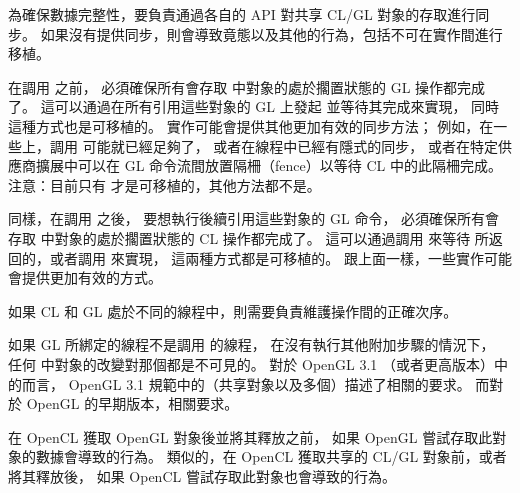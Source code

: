 為確保數據完整性，要負責通過各自的 API 對共享 CL/GL 對象的存取進行同步。
如果沒有提供同步，則會導致竟態以及其他的行為，包括不可在實作間進行移植。

在調用  之前，
必須確保所有會存取  中對象的處於擱置狀態的 GL 操作都完成了。
這可以通過在所有引用這些對象的 GL 上發起  並等待其完成來實現，
同時這種方式也是可移植的。
實作可能會提供其他更加有效的同步方法；
例如，在一些上，調用  可能就已經足夠了，
或者在線程中已經有隱式的同步，
或者在特定供應商擴展中可以在 GL 命令流間放置隔柵（fence）以等待 CL 中的此隔柵完成。
注意：目前只有  才是可移植的，其他方法都不是。

同樣，在調用  之後，
要想執行後續引用這些對象的 GL 命令，
必須確保所有會存取  中對象的處於擱置狀態的 CL 操作都完成了。
這可以通過調用  來等待  所返回的，或者調用  來實現，
這兩種方式都是可移植的。
跟上面一樣，一些實作可能會提供更加有效的方式。

如果 CL 和 GL  處於不同的線程中，則需要負責維護操作間的正確次序。

如果 GL 所綁定的線程不是調用  的線程，
在沒有執行其他附加步驟的情況下，
任何  中對象的改變對那個都是不可見的。
對於 OpenGL 3.1 （或者更高版本）中的而言，
OpenGL 3.1 規範中的{}（共享對象以及多個）描述了相關的要求。
而對於 OpenGL 的早期版本，相關要求。

在 OpenCL 獲取 OpenGL 對象後並將其釋放之前，
如果 OpenGL 嘗試存取此對象的數據會導致的行為。
類似的，在 OpenCL 獲取共享的 CL/GL 對象前，或者將其釋放後，
如果 OpenCL 嘗試存取此對象也會導致的行為。

